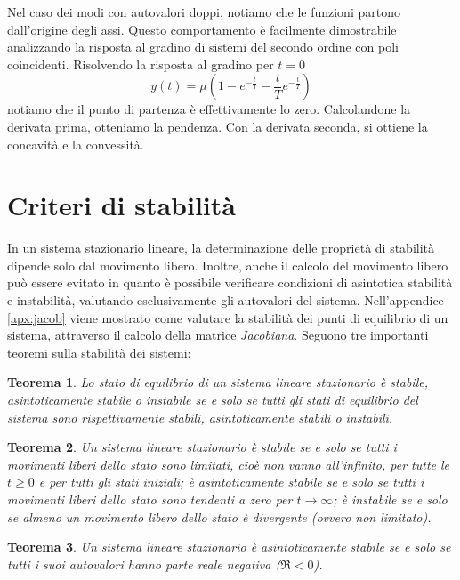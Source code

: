 \documentclass[a4paper]{report}
\begin{document}
Nel caso dei modi con autovalori doppi, notiamo che le funzioni
partono dall'origine degli assi. Questo comportamento \`e facilmente
dimostrabile analizzando la risposta al gradino di sistemi del secondo
ordine con poli coincidenti. Risolvendo la risposta al gradino per $t
= 0$
\[
y(t) = \mu \left(1 - e^{- \frac{t}{T}} - \dfrac{t}{T}e^{- \frac{t}{T}}\right)
\]
notiamo che il punto di partenza \`e effettivamente lo
zero. Calcolandone la derivata prima, otteniamo la pendenza. Con la
derivata seconda, si ottiene la concavit\`a e la convessit\`a.

\section{Criteri di stabilit\`a}
In un sistema stazionario lineare, la determinazione delle propriet\`a
di stabilit\`a dipende solo dal movimento libero. Inoltre, anche il
calcolo del movimento libero pu\`o essere evitato in quanto \`e possibile
verificare condizioni di asintotica stabilit\`a e instabilit\`a,
valutando esclusivamente gli autovalori del sistema. Nell'appendice
\ref{apx:jacob} viene mostrato come valutare la stabilit\`a dei punti
di equilibrio di un sistema, attraverso il calcolo della matrice
\textsl{Jacobiana}. 
Seguono tre importanti teoremi sulla stabilit\`a dei sistemi:
\newtheorem{Th1}{Teorema}[section]
\newtheorem{Th2}[Th1]{Teorema}
\newtheorem{Th3}[Th1]{Teorema}
\newtheorem{Th4}[Th1]{Teorema}
 
\begin{Th1}\label{th:th1}
  Lo stato di equilibrio di un sistema lineare stazionario \`e stabile,
  asintoticamente stabile o instabile se e solo se tutti gli stati di
  equilibrio del sistema sono rispettivamente stabili, asintoticamente
  stabili o instabili. 
\end{Th1}

\begin{Th2}\label{th:th2}
  Un sistema lineare stazionario \`e stabile se e solo se tutti i
  movimenti liberi dello stato sono limitati, cio\`e non vanno
  all'infinito, per tutte le $t \geq 0$ e per tutti gli stati iniziali;
  \`e asintoticamente stabile se e solo se tutti i movimenti liberi dello
  stato sono tendenti a zero per $t \to \infty$; \`e instabile se e solo
  se almeno un movimento libero dello stato \`e divergente (ovvero non
  limitato).
\end{Th2}

\begin{Th3}\label{th:th3}
  Un sistema lineare stazionario \`e asintoticamente stabile se e solo
  se tutti i suoi autovalori hanno parte reale negativa ($\Re<0$).
\end{Th3}
\end{document}
